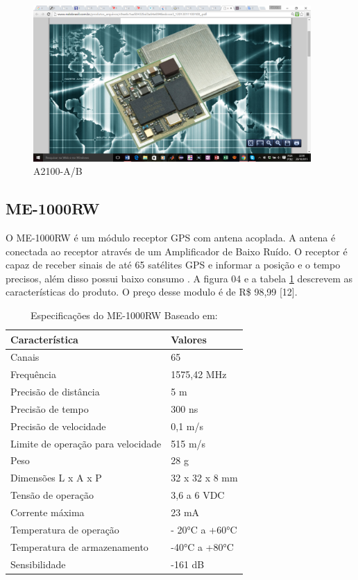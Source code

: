   \begin{figure}[h]
    \centering
    \includegraphics[width=400px, scale=1]{figuras/a2100}
    \caption{A2100-A/B   \cite{10gps}}
  \label{fig:a2100}
  \end{figure}

  \subsection{ME-1000RW}

  O ME-1000RW é um módulo receptor GPS com antena acoplada. A antena é conectada
  ao receptor através de um Amplificador de Baixo Ruído. O receptor é capaz de
  receber sinais de até 65 satélites GPS e informar a posição e o tempo precisos,
  além disso possui baixo consumo \cite{11gps}. A figura 04 e a tabela \ref{table:especificacao_gps_me1000}
  descrevem as  características do produto. O preço desse modulo é de R\$ 98,99 [12].


\begin{table}[ht]
\caption{Especificações do ME-1000RW Baseado em: \cite{11gps}}
\centering
\begin{tabular}{| l |  p{10cm} |}
\hline
Característica & Valores \\
\hline
Canais & 65 \\
\hline
Frequência & 1575,42 MHz \\
\hline
Precisão de distância & 5 m \\
\hline
Precisão de tempo & 300 ns \\
\hline
Precisão de velocidade & 0,1 m/s \\
\hline
Limite de operação para velocidade & 515 m/s \\
\hline
Peso & 28 g \\
\hline
Dimensões L x A x P & 32 x 32 x 8 mm \\
\hline
Tensão de operação & 3,6 a 6 VDC \\
\hline
Corrente máxima & 23 mA \\
\hline
Temperatura de operação & - 20°C a +60°C \\
\hline
Temperatura de armazenamento & -40°C a +80°C \\
\hline
Sensibilidade & -161 dB \\
\hline
\end{tabular}
\label{table:especificacao_gps_me1000}
\end{table}


